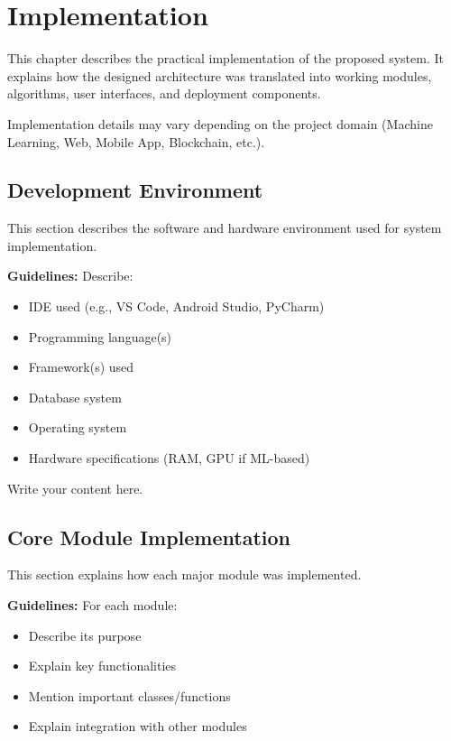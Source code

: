 
\chapter{Implementation}

This chapter describes the practical implementation of the proposed system. 
It explains how the designed architecture was translated into working modules, 
algorithms, user interfaces, and deployment components.

Implementation details may vary depending on the project domain 
(Machine Learning, Web, Mobile App, Blockchain, etc.).


\section{Development Environment}

This section describes the software and hardware environment used 
for system implementation.

\textbf{Guidelines:}
Describe:
\begin{itemize}
    \item IDE used (e.g., VS Code, Android Studio, PyCharm)
    \item Programming language(s)
    \item Framework(s) used
    \item Database system
    \item Operating system
    \item Hardware specifications (RAM, GPU if ML-based)
\end{itemize}

Write your content here.


\section{Core Module Implementation}

This section explains how each major module was implemented.

\textbf{Guidelines:}
For each module:
\begin{itemize}
    \item Describe its purpose
    \item Explain key functionalities
    \item Mention important classes/functions
    \item Explain integration with other modules
\end{itemize}

